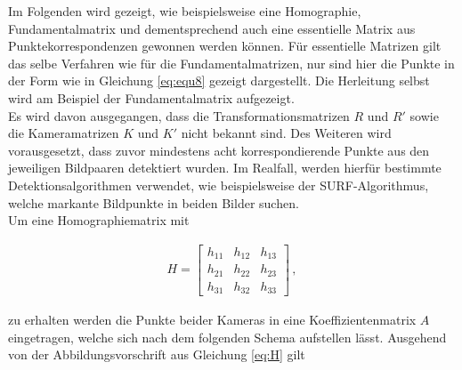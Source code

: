 Im Folgenden wird gezeigt, wie beispielsweise eine Homographie, Fundamentalmatrix und dementsprechend auch eine essentielle Matrix aus Punktekorrespondenzen gewonnen werden können. Für essentielle Matrizen gilt das selbe Verfahren wie für die Fundamentalmatrizen, nur sind hier die Punkte in der Form wie in Gleichung \ref{eq:equ8} gezeigt dargestellt. Die Herleitung selbst wird am Beispiel der Fundamentalmatrix aufgezeigt.\\

Es wird davon ausgegangen, dass die Transformationsmatrizen $R$ und $R'$ sowie die Kameramatrizen $K$ und $K'$ nicht bekannt sind. Des Weiteren wird vorausgesetzt, dass zuvor mindestens acht korrespondierende Punkte aus den jeweiligen Bildpaaren detektiert wurden. Im Realfall, werden hierfür bestimmte Detektionsalgorithmen verwendet, wie beispielsweise der SURF-Algorithmus\cite{SURF}, welche markante Bildpunkte in beiden Bilder suchen.\\


Um eine Homographiematrix mit 

\begin{gather}
	H=
	\begin{bmatrix}
		h_{11}&h_{12}&h_{13}\\
		h_{21}&h_{22}&h_{23}\\
		h_{31}&h_{32}&h_{33}
	\end{bmatrix} \, ,
\end{gather}

zu erhalten werden die Punkte beider Kameras in eine Koeffizientenmatrix $A$ eingetragen, welche sich nach dem folgenden Schema aufstellen lässt\cite{HZ,Elements}. Ausgehend von der Abbildungsvorschrift aus Gleichung \ref{eq:H} gilt

